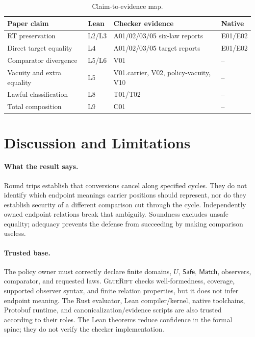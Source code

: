 \documentclass[sigconf,anonymous,review]{acmart}
\newcommand{\sys}{\textsc{GlueRift}\xspace}
\newcommand{\safe}{\mathsf{Safe}}
\newcommand{\matchrel}{\mathsf{Match}}
\begin{document}
\begin{table}[t]
\caption{Claim-to-evidence map.}
\label{tab:evidence-map}
\centering
\scriptsize
\setlength{\tabcolsep}{2.7pt}
\begin{tabular}{p{}p{}p{}p{}}
\toprule
Paper claim & Lean & Checker evidence & Native\\
\midrule
RT preservation & L2/L3 & A01/02/03/05 six-law reports & E01/E02\\
Direct target equality & L4 & A01/02/03/05 target reports & E01/E02\\
Comparator divergence & L5/L6 & V01 & --\\
Vacuity and extra equality & L5 & V01.carrier, V02, policy-vacuity, V10 & --\\
Lawful classification & L8 & T01/T02 & --\\
Total composition & L9 & C01 & --\\
\bottomrule
\end{tabular}
\end{table}

\section{Discussion and Limitations}

\paragraph{What the result says.}
Round trips establish that conversions cancel along specified cycles.
They do not identify which endpoint meanings carrier positions should
represent, nor do they establish security of a different comparison
cut through the cycle.  Independently owned endpoint relations break
that ambiguity.  Soundness excludes unsafe equality; adequacy prevents
the defense from succeeding by making comparison useless.

\paragraph{Trusted base.}
The policy owner must correctly declare finite domains, $U$, $\safe$,
$\matchrel$, observers, comparator, and requested laws.  \sys checks
well-formedness, coverage, supported observer syntax, and finite
relation properties, but it does not infer endpoint meaning.  The Rust
evaluator, Lean compiler/kernel, native toolchains, Protobuf runtime,
and canonicalization/evidence scripts are also trusted according to
their roles.  The Lean theorems reduce confidence in the formal spine;
they do not verify the checker implementation.
\end{document}
